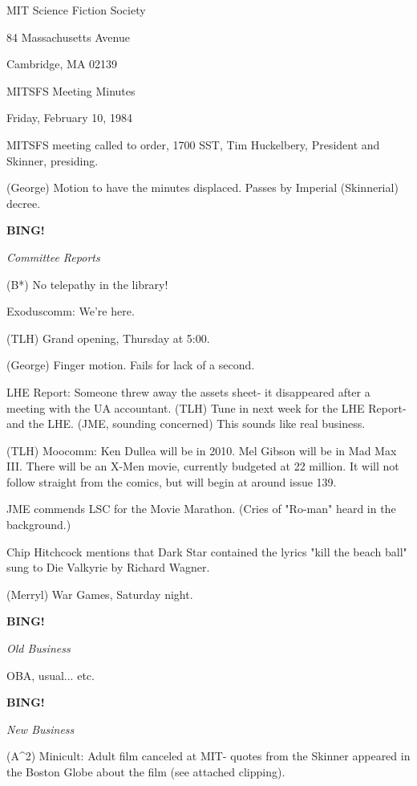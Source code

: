 \documentclass[12pt]{article}
\newcommand{\bing}{{\bf BING!} }
\newcommand{\goto}[1]{\bing \vskip 12pt \centerline{{\em{#1}}}}
\begin{document}
\begin{center}

MIT Science Fiction Society 

84 Massachusetts Avenue

Cambridge, MA 02139

\vspace{12pt}

MITSFS Meeting Minutes 

Friday, February 10, 1984

\end{center}
 
\vspace{18pt}

\setlength{\parskip}{6pt}

\noindent
MITSFS meeting called to order, 1700 SST,
Tim Huckelbery, President and Skinner, presiding.

(George) Motion to have the minutes displaced. Passes by Imperial (Skinnerial) decree.

\goto{Committee Reports}

(B*) No telepathy in the library!

Exoduscomm: We're here.

(TLH) Grand opening, Thursday at 5:00.

(George) Finger motion. Fails for lack of a second.

LHE Report: Someone threw away the assets sheet- it disappeared after a meeting with the UA accountant. (TLH) Tune in next week for the LHE Report- and the LHE. (JME, sounding concerned) This sounds like real business.

(TLH) Moocomm: Ken Dullea will be in 2010. Mel Gibson will be in Mad Max III. There will be an X-Men movie, currently budgeted at 22 million. It will not follow straight from the comics, but will begin at around issue 139.

JME commends LSC for the Movie Marathon. (Cries of "Ro-man" heard in the background.)

Chip Hitchcock mentions that Dark Star contained the lyrics "kill the beach ball" sung to Die Valkyrie by Richard Wagner.

(Merryl) War Games, Saturday night.

\goto{Old Business}

OBA, usual... etc.

\goto{New Business}

(A^2) Minicult: Adult film canceled at MIT- quotes from the Skinner appeared in the Boston Globe about the film (see attached clipping).
\end{document}
